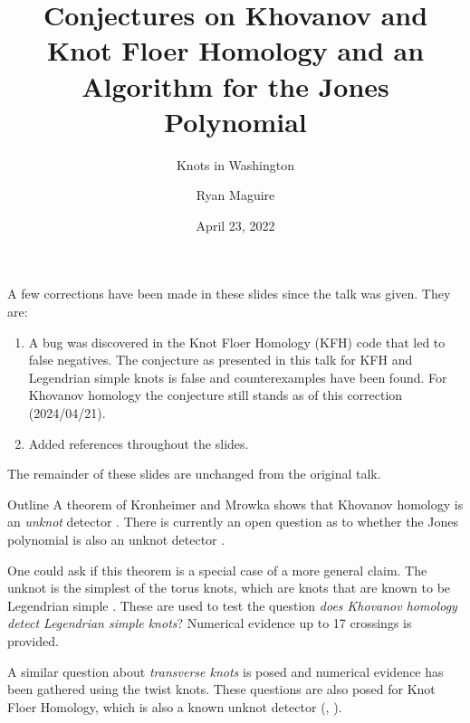 \documentclass{beamer}
\title{%
    Conjectures on Khovanov and Knot Floer Homology and an
    Algorithm for the Jones Polynomial
}
\subtitle{Knots in Washington}
\author{Ryan Maguire}
\institute{Dartmouth College}
\date{April 23, 2022}
\begin{document}
    \maketitle
    \begin{frame}{\textbf{\color{red}{Corrections}}}
        A few corrections have been made in these slides since the talk was
        given. They are:
        \begin{enumerate}
            \item
                A bug was discovered in the Knot Floer Homology (KFH) code that
                led to false negatives. The conjecture as presented in this
                talk for KFH and Legendrian simple knots is false and
                counterexamples have been found. For Khovanov homology the
                conjecture still stands as of this correction
                (2024/04/21).
            \item Added references throughout the slides.
        \end{enumerate}
        The remainder of these slides are unchanged from the original talk.
    \end{frame}
    \begin{frame}{Outline}
        A theorem of Kronheimer and Mrowka shows that Khovanov homology is
        an \textit{unknot} detector
        \cite{KronheimerMrowka2011KhovanovUnknot}.
        There is currently an open question as to
        whether the Jones polynomial is also an unknot detector
        \cite{VerificationUnknotJonesConjUpTo24}.
        \par\hfill\par
        One could ask if this theorem is a special case of a more general claim.
        The unknot is the simplest of the torus knots, which are knots that are
        known to be Legendrian simple
        \cite[p.~64]{EtnyreHondaContactTopologyI}.
        These are used to test the question
        \textit{does Khovanov homology detect Legendrian simple knots}?
        Numerical evidence up to 17 crossings is provided.
        \par\hfill\par
        A similar question about \textit{transverse knots} is posed and
        numerical evidence has been gathered using the twist knots. These
        questions are also posed for Knot Floer Homology, which is also a
        known unknot detector
        (\cite[p.~633]{ManolescuOzsvathSarkarCombinatorialDescriptionOfKnotFloerHomology},
        \cite[p.~313]{OzsvathSzaboHolomorphicDisksGenusBounds}).
    \end{frame}
\end{document}
